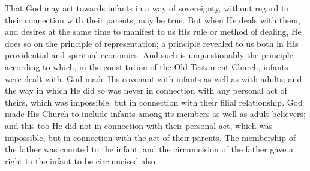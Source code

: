 \documentclass[english,]{book}
\begin{document}
That God may act towards infants in a way of sovereignty, without regard to their connection with their parents, may be true. But when He deals with them, and desires at the same time to manifest to us His rule or method of dealing, He does so on the principle of representation; a principle revealed to us both in His providential and spiritual economies. And such is unquestionably the principle according to which, in the constitution of the Old Testament Church, infants were dealt with. God made His covenant with infants as well as with adults; and the way in which He did so was never in connection with any personal act of theirs, which was impossible, but in connection with their filial relationship. God made His Church to include infants among its members as well as adult believers; and this too He did not in connection with their personal act, which was impossible, but in connection with the act of their parents. The membership of the father was counted to the infant; and the circumcision of the father gave a right to the infant to be circumcised also.
\end{document}
